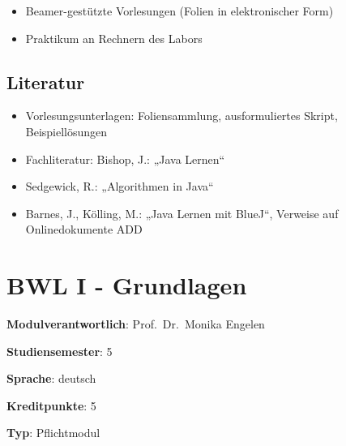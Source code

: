 \begin{itemize}
\tightlist
\item
  Beamer-gestützte Vorlesungen (Folien in elektronischer Form)
\item
  Praktikum an Rechnern des Labors
\end{itemize}

\hypertarget{literaturpathlabelmi-2017modulbeschreibungen-bachelorba_algorithmenundprogrammierung2}{%
\section*{Literatur\label{/mi-2017/modulbeschreibungen-bachelor/BA_AlgorithmenundProgrammierung2}}\label{literaturpathlabelmi-2017modulbeschreibungen-bachelorba_algorithmenundprogrammierung2}}

\begin{itemize}
\tightlist
\item
  Vorlesungsunterlagen: Foliensammlung, ausformuliertes Skript,
  Beispiellösungen
\item
  Fachliteratur: Bishop, J.: „Java Lernen``
\item
  Sedgewick, R.: „Algorithmen in Java``
\item
  Barnes, J., Kölling, M.: „Java Lernen mit BlueJ``, Verweise auf
  Onlinedokumente ADD
\end{itemize}

\hypertarget{bwl-i---grundlagenpathlabelmi-2017modulbeschreibungen-bachelorba_bwl1}{%
\chapter{BWL I -
Grundlagen\label{/mi-2017/modulbeschreibungen-bachelor/BA_BWL1}}\label{bwl-i---grundlagenpathlabelmi-2017modulbeschreibungen-bachelorba_bwl1}}

\begin{modulHead}
\textbf{Modulverantwortlich}: Prof.~Dr.~Monika
Engelen
\end{modulHead}
\begin{modulHead}
\textbf{Studiensemester}:
5
\end{modulHead}
\begin{modulHead}
\textbf{Sprache}:
deutsch
\end{modulHead}
\begin{modulHead}
\textbf{Kreditpunkte}:
5
\end{modulHead}
\begin{modulHead}
\textbf{Typ}:
Pflichtmodul
\end{modulHead}


